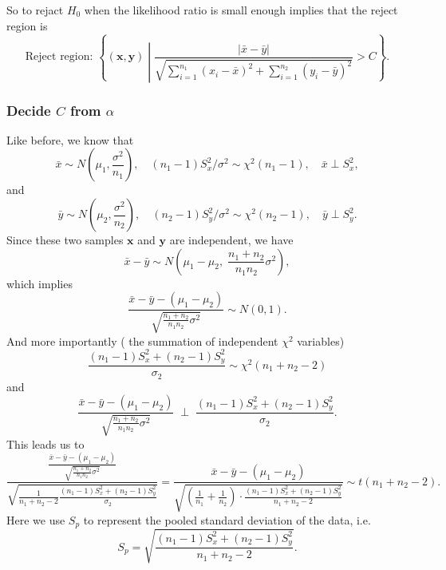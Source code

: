 \documentclass[a4paper,12pt]{article}
\begin{document}
So to rejact $H_0$ when the likelihood ratio is small enough implies that the reject region is
\[
  \text{Reject region: }
  \left\{
    \left(\bm{x}, \bm{y}\right)
    \middle|
    \frac{\left|\bar{x} - \bar{y}\right|}{
      \sqrt{
               \sum\limits_{i = 1}^{n_1}\left(x_i - \bar{x}\right)^2
       + \sum\limits_{i = 1}^{n_2}\left(y_i - \bar{y}\right)^2 
      }
    }
    > C
  \right\}
  .
\]

\subsubsection{Decide $C$ from $\alpha$}
\label{sec:decide-c-from-3}

Like before, we know that
\[
  \bar{x} \sim N\left(\mu_1, \frac{\sigma^2}{n_1}\right)
  ,\quad
  \left(n_1 - 1\right)S_x^2 / \sigma^2 \sim \chi^2\left(n_1 - 1\right)
  ,\quad
  \bar{x}\perp S_x^2
  ,
\]
and
\[ 
  \bar{y} \sim N\left(\mu_2, \frac{\sigma^2}{n_2}\right)
  ,\quad
  \left(n_2 - 1\right)S_y^2 / \sigma^2 \sim \chi^2\left(n_2 - 1\right)
  ,\quad
  \bar{y}\perp S_y^2
  .
\]
Since these two samples $\bm{x}$ and $\bm{y}$ are independent, we have
\[
  \bar{x} - \bar{y}
  \sim N\left(
    \mu_1 - \mu_2,\;
    \frac{n_1 + n_2}{n_1n_2}\sigma^2
  \right)
  ,
\]
which implies
\[
  \frac{\bar{x} - \bar{y} - \left(\mu_1 - \mu_2\right)}{
    \sqrt{
      \frac{n_1 + n_2}{n_1n_2}\sigma^2
    }
  }
  \sim N\left(0, 1\right)
  .
\]
And more importantly ({\color{red} the summation of independent $\chi^2$ variables})
\[
  \frac{
    \left(n_1 - 1\right)S_x^2 + \left(n_2 - 1\right)S_y^2
  }{\sigma_2}
  \sim \chi^2\left(n_1 + n_2 - 2\right)
\]
and
\[
    \frac{\bar{x} - \bar{y} - \left(\mu_1 - \mu_2\right)}{
    \sqrt{
      \frac{n_1 + n_2}{n_1n_2}\sigma^2
    }
  }
  \;\bm{\perp}\;
    \frac{
    \left(n_1 - 1\right)S_x^2 + \left(n_2 - 1\right)S_y^2
  }{\sigma_2}
  .
\]
This leads us to
\[
  \frac{
    \frac{\bar{x} - \bar{y} - \left(\mu_1 - \mu_2\right)}{
      \sqrt{
        \frac{n_1 + n_2}{n_1n_2}\sigma^2
      }
    }
  }{
    \sqrt{
      \frac{1}{n_1 + n_2 - 2}
      \frac{
        \left(n_1 - 1\right)S_x^2 + \left(n_2 - 1\right)S_y^2
      }{\sigma_2}
    }
  }
  = \frac{
    \bar{x} - \bar{y} - \left(\mu_1 - \mu_2\right)
  }{\sqrt{
      \left(
        \frac{1}{n_1} + \frac{1}{n_2}
      \right)
      \cdot
      \frac{
        \left(n_1 - 1\right)S_x^2 + \left(n_2 - 1\right)S_y^2
      }{
        n_1 + n_2 - 2
      }
    }
  }
  \sim t(n_1 + n_2 - 2)
  .
\]
Here we use $S_p$ to represent the pooled standard deviation of the data, i.e.
\[
  S_p = \sqrt{
    \frac{
      \left(n_1 - 1\right)S_x^2 + \left(n_2 - 1\right)S_y^2
    }{
      n_1 + n_2 - 2
    }
  }
  .
\]
\end{document}
